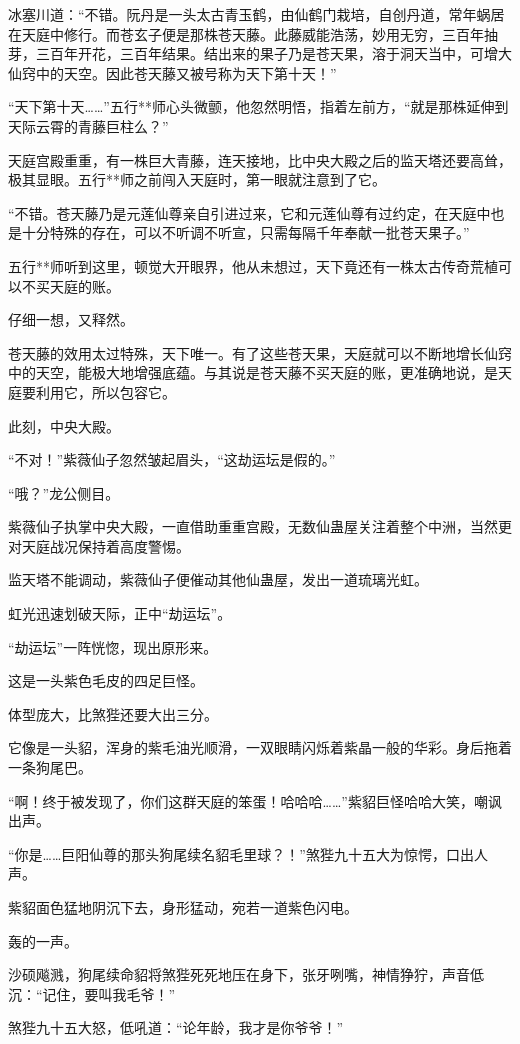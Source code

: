 \begin{this_body}
冰塞川道：“不错。阮丹是一头太古青玉鹤，由仙鹤门栽培，自创丹道，常年蜗居在天庭中修行。而苍玄子便是那株苍天藤。此藤威能浩荡，妙用无穷，三百年抽芽，三百年开花，三百年结果。结出来的果子乃是苍天果，溶于洞天当中，可增大仙窍中的天空。因此苍天藤又被号称为天下第十天！”

“天下第十天……”五行**师心头微颤，他忽然明悟，指着左前方，“就是那株延伸到天际云霄的青藤巨柱么？”

天庭宫殿重重，有一株巨大青藤，连天接地，比中央大殿之后的监天塔还要高耸，极其显眼。五行**师之前闯入天庭时，第一眼就注意到了它。

“不错。苍天藤乃是元莲仙尊亲自引进过来，它和元莲仙尊有过约定，在天庭中也是十分特殊的存在，可以不听调不听宣，只需每隔千年奉献一批苍天果子。”

五行**师听到这里，顿觉大开眼界，他从未想过，天下竟还有一株太古传奇荒植可以不买天庭的账。

仔细一想，又释然。

苍天藤的效用太过特殊，天下唯一。有了这些苍天果，天庭就可以不断地增长仙窍中的天空，能极大地增强底蕴。与其说是苍天藤不买天庭的账，更准确地说，是天庭要利用它，所以包容它。

此刻，中央大殿。

“不对！”紫薇仙子忽然皱起眉头，“这劫运坛是假的。”

“哦？”龙公侧目。

紫薇仙子执掌中央大殿，一直借助重重宫殿，无数仙蛊屋关注着整个中洲，当然更对天庭战况保持着高度警惕。

监天塔不能调动，紫薇仙子便催动其他仙蛊屋，发出一道琉璃光虹。

虹光迅速划破天际，正中“劫运坛”。

“劫运坛”一阵恍惚，现出原形来。

这是一头紫色毛皮的四足巨怪。

体型庞大，比煞狴还要大出三分。

它像是一头貂，浑身的紫毛油光顺滑，一双眼睛闪烁着紫晶一般的华彩。身后拖着一条狗尾巴。

“啊！终于被发现了，你们这群天庭的笨蛋！哈哈哈……”紫貂巨怪哈哈大笑，嘲讽出声。

“你是……巨阳仙尊的那头狗尾续名貂毛里球？！”煞狴九十五大为惊愕，口出人声。

紫貂面色猛地阴沉下去，身形猛动，宛若一道紫色闪电。

轰的一声。

沙硕飚溅，狗尾续命貂将煞狴死死地压在身下，张牙咧嘴，神情狰狞，声音低沉：“记住，要叫我毛爷！”

煞狴九十五大怒，低吼道：“论年龄，我才是你爷爷！”


\end{this_body}
